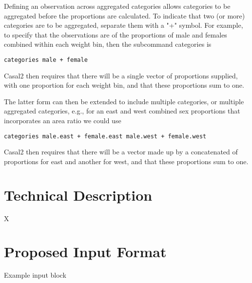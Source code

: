 \documentclass[a4paper,11pt,twoside,pdftex,draft]{article}
\begin{document}
Defining an observation across aggregated categories allows categories to be aggregated before the proportions are calculated.  To indicate that two (or more) categories are to be aggregated, separate them with a "+" symbol. For example, to specify that the observations are of the proportions of male and females combined within each weight bin, then the subcommand categories is

\texttt{categories male + female}

Casal2 then requires that there will be a single vector of proportions supplied, with one proportion for each weight bin, and that these proportions sum to one.

The latter form can then be extended to include multiple categories, or multiple aggregated categories, e.g., for an east and west combined sex proportions that incorporates an area ratio we could use

\texttt{categories male.east + female.east   male.west + female.west}

Casal2 then requires that there will be a vector made up by a concatenated of proportions for east and another for west, and that these proportions sum to one.

\section{Technical Description}

X

\section{Proposed Input Format}

Example input block
\end{document}
